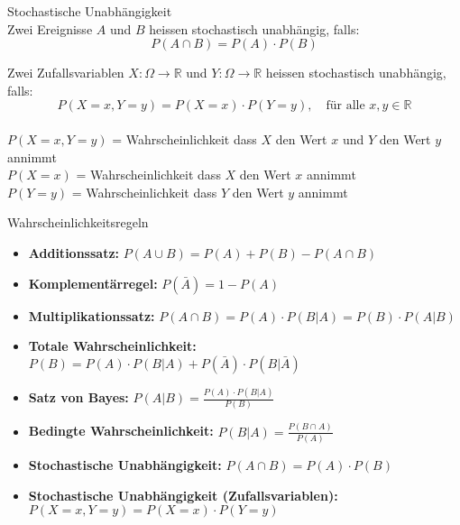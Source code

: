 \begin{theorem}{Stochastische Unabhängigkeit}\\
Zwei Ereignisse $A$ und $B$ heissen stochastisch unabhängig, falls:
$$
P(A \cap B)=P(A) \cdot P(B)
$$

Zwei Zufallsvariablen $X: \Omega \rightarrow \mathbb{R}$ und $Y: \Omega \rightarrow \mathbb{R}$ heissen stochastisch unabhängig, falls:
$$
P(X=x, Y=y)=P(X=x) \cdot P(Y=y), \quad \text{für alle } x, y \in \mathbb{R}
$$
\\
$P(X=x, Y=y)$ = Wahrscheinlichkeit dass $X$ den Wert $x$ und $Y$ den Wert $y$ annimmt\\
$P(X=x)$ = Wahrscheinlichkeit dass $X$ den Wert $x$ annimmt\\
$P(Y=y)$ = Wahrscheinlichkeit dass $Y$ den Wert $y$ annimmt\\
\end{theorem}

\begin{corollary}{Wahrscheinlichkeitsregeln}
\begin{itemize}
    \item \textbf{Additionssatz:} $P(A \cup B) = P(A) + P(B) - P(A \cap B)$
    \item \textbf{Komplementärregel:} $P(\bar{A}) = 1 - P(A)$
    \item \textbf{Multiplikationssatz:} $P(A \cap B) = P(A) \cdot P(B|A) = P(B) \cdot P(A|B)$
    \item \textbf{Totale Wahrscheinlichkeit:} $P(B) = P(A) \cdot P(B|A) + P(\bar{A}) \cdot P(B|\bar{A})$
    \item \textbf{Satz von Bayes:} $P(A|B) = \frac{P(A) \cdot P(B|A)}{P(B)}$
    \item \textbf{Bedingte Wahrscheinlichkeit:} $P(B|A) = \frac{P(B \cap A)}{P(A)}$
    \item \textbf{Stochastische Unabhängigkeit:} $P(A \cap B) = P(A) \cdot P(B)$
    \item \textbf{Stochastische Unabhängigkeit (Zufallsvariablen):} $P(X=x, Y=y) = P(X=x) \cdot P(Y=y)$
\end{itemize}   
\end{corollary}



